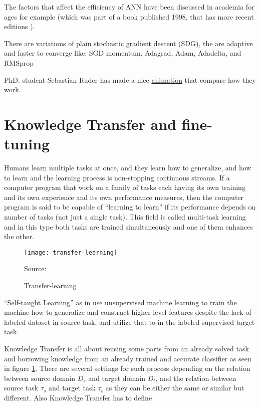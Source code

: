 The factors that affect the efficiency of ANN have been discussed in academia for ages
for example \autocite{lecuniefficient}
(which was part of a book published 1998\autocite{orr1998neural}, that has more recent editions \autocite{orr2012neural}).

There are variations of plain stochastic gradient descent (SDG), the are adaptive and faster to converge like:
SGD momentum\autocite{sutskever2013importance},
Adagrad\autocite{duchi2011adaptive},
Adam\autocite{kingma2014adam},
Adadelta\autocite{zeiler2012adadelta},
and RMSprop\autocite{dozat2016incorporating}\autocite{sutskever2013importance}

PhD. student Sebastian Ruder has made a nice \href{http://sebastianruder.com/optimizing-gradient-descent/}{animation} that compare how they work.

\section{Knowledge Transfer and fine-tuning}

Humans learn multiple tasks at once, and they learn how to generalize,
and how to learn and the learning process is non-stopping continuous streams.
If a computer program that work on a family of tasks each having its own training and
its own experience and its own performance measures, then the computer program is said\autocite{thrun1998learning}
to be capable of ``learning to learn'' if its performance depends on number of tasks (not just a single task).
This field is called multi-task learning and in this type both tasks are trained simultaneously and
one of them enhances the other.

\begin{figure}[!h]
\centering
\texttt{[image: transfer-learning]}
\caption{Transfer-learning}\label{fig:transfer-learning}
{Source: \autocite{pan2010survey}\hfill}
\end{figure}

``Self-taught Learning'' as in \autocite{raina2007self} use unsupervised machine learning to train the machine
how to generalize and construct higher-level features despite the lack of labeled dataset in source task,
and utilize that to in the labeled supervised target task.

Knowledge Transfer is all about reusing some parts from an already solved task and
borrowing knowledge from an already trained and accurate classifier as seen in figure \ref{fig:transfer-learning}.
There are several settings for such process\autocite{pan2010survey} depending on the relation between
source domain \( D_{s} \) and target domain \( D_{t} \), and the relation between
source task \( \tau_{s} \) and target task \( \tau_{t} \) as they can be either the same or similar but different.
Also Knowledge Transfer has to define\autocite{pan2010survey}

